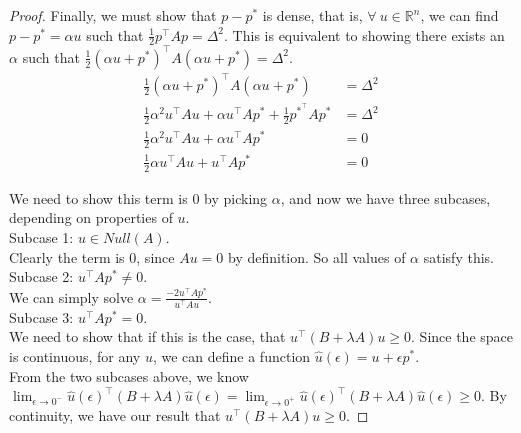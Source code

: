 \documentclass[a4paper]{article}
\begin{document}
\begin{proof}
Finally, we must show that $p - p^*$ is dense, that is, $\forall\ u \in \mathbb{R}^n$, we can find $p - p^* = \alpha u$ such that $\frac{1}{2} p^\intercal A p = \Delta^2$. This is equivalent to showing there exists an $\alpha$ such that $\frac{1}{2} (\alpha u + p^*)^\intercal A (\alpha u + p^*) = \Delta^2$.
\begin{align*}
\frac{1}{2} (\alpha u + p^*)^\intercal A (\alpha u + p^*) &= \Delta^2 \\
\frac{1}{2} \alpha^2 u^\intercal A u + \alpha u^\intercal A p^* + \frac{1}{2} p^{*^\intercal} A p^* &= \Delta^2 \\
\frac{1}{2} \alpha^2 u^\intercal A u + \alpha u^\intercal A p^* &= 0 \\
\frac{1}{2} \alpha u^\intercal A u + u^\intercal A p^* &= 0
\end{align*}

We need to show this term is $0$ by picking $\alpha$, and now we have three subcases, depending on properties of $u$. \\

Subcase 1: $u \in Null(A)$. \\

Clearly the term is $0$, since $Au = 0$ by definition. So all values of $\alpha$ satisfy this. \\

Subcase 2: $u^\intercal A p^* \neq 0$. \\

We can simply solve $\alpha = \frac{-2 u^\intercal A p^*}{u^\intercal A u}$. \\

Subcase 3: $u^\intercal A p^* = 0$. \\

We need to show that if this is the case, that $u^\intercal (B + \lambda A) u \geq 0$. Since the space is continuous, for any $u$, we can define a function $\hat u(\epsilon) = u + \epsilon p^*$. \\

From the two subcases above, we know $\lim_{\epsilon \rightarrow 0^-} \hat u(\epsilon)^\intercal (B + \lambda A) \hat u(\epsilon) = \lim_{\epsilon \rightarrow 0^+} \hat u(\epsilon)^\intercal (B + \lambda A) \hat u(\epsilon) \geq 0$. By continuity, we have our result that $u^\intercal (B + \lambda A) u \geq 0$.

\end{proof}
\end{document}
